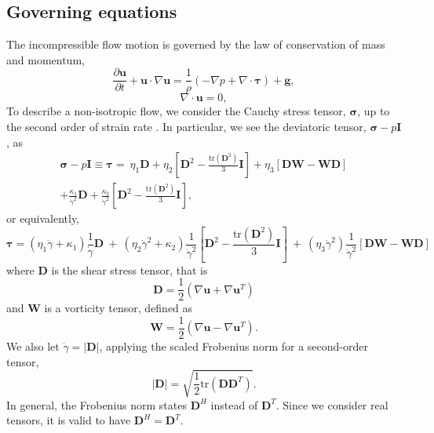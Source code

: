\subsection{Governing equations}
The incompressible flow motion is governed by the law of conservation of mass and momentum,
\begin{equation}
  \frac{\partial {\bm u}}{\partial t} 
  + {\bm u} \cdot \nabla {\bm u} = \frac{1}{\rho}
  \left( 
    -\nabla p + \nabla \cdot {\bm {\bm \tau}}\right) + {\bm g},
  \label{eq_momentum}
\end{equation}
\begin{equation}
  \nabla \cdot {\bm u} = 0,
  \label{eq_mass}
\end{equation}
To describe a non-isotropic flow, we consider the Cauchy stress tensor, ${\bm \sigma}$, up to the second order of strain rate \cite{srivastava_viscometric_2021}. In particular, we see the deviatoric tensor, ${\bm \sigma} - p {\bm I}$, as 
\begin{align*}
{\bm \sigma} - p {\bm I} \equiv
  {\bm {\bm \tau}}
  =  \ \eta_1 {\bm D} 
  + \eta_2  \left[ {\bm D}^2  - \frac{\text{tr}\left({\bm D}^2\right)}{3}{\bm I} \right]
  + \eta_3  \left[ {\bm D}{\bm W} - {\bm W}{\bm D} \right]
  \nonumber \\
  + \frac{\kappa_1}{\dot{\gamma }^2} \bm D 
  + \frac{\kappa_2}{\dot{\gamma }^2}  \left[ {\bm D}^2  
  - \frac{\text{tr}\left({\bm D}^2\right)}{3}{\bm I} \right],
\end{align*}
or equivalently, 
\begin{equation}
  {\bm {\bm \tau}}
  = \left( \eta_1 \dot{\gamma}+ \kappa_1 \right) \frac{1}{\dot{\gamma}} {\bm D}
  \ +  \ 
  \left( \eta_2  \dot{\gamma}^2
  +  \kappa_2 
  \right) \frac{1}{\dot{\gamma}^2}
  \left[ {\bm D}^2  - \frac{\text{tr}\left({\bm D}^2\right)}{3}{\bm I} \right]
  \ + \
  \left( \eta_3 \dot{\gamma}^2 \right)
  \frac{1}{\dot{\gamma}^2}
    \left[ {\bm D}{\bm W} - {\bm W}{\bm D} \right]
\label{eq_2ndOrder_tau}
\end{equation}
where ${\bm D} $ is the shear stress tensor, that is
\[
	{\bm D} = \frac{1}{2}\left( \nabla {\bm u} + \nabla {\bm u}^{T}\right)	
\]
and ${\bm W}$ is a vorticity tensor, defined as 
\[
	{\bm W} = \frac{1}{2}\left( \nabla {\bm u} - \nabla {\bm u}^{T}\right).
\]
We also let $\dot{\gamma} = \left| {\bm D} \right|$, applying the scaled Frobenius norm for a second-order tensor, 
\[
    |\bm{D}| = \sqrt{\frac{1}{2}
    \text{tr}\left(\bm{D} \bm{D}^{T} \right)}.
\]
In general, the Frobenius norm states $\bm{D}^H$ instead of $\bm{D}^T$. Since we consider real tensors, it is valid to have $\bm{D}^H = \bm{D}^T$. 
